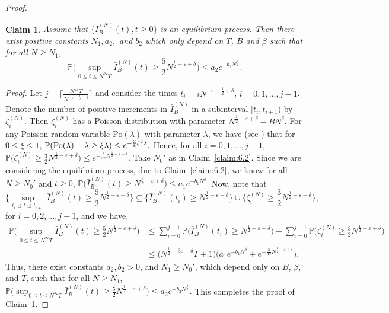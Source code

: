 \documentclass[11pt, reqno]{article}
\DeclarePairedDelimiter\autobracket{(}{)}
\newcommand{\br}[1]{\autobracket*{#1}}
\newtheorem{claim}[theorem]{Claim}
\numberwithin{equation}{section}
\numberwithin{theorem}{section}
\begin{document}
\begin{proof}
\begin{claim}\label{claim:stat-proc}
Assume that $\{\bar{I}^{(N)}_B(t),t\geq 0\}$ is an equilibrium process. Then there exist positive constants $N_1, a_2,$ and $b_2$ which only depend on $T$, $B$ and $\beta$ such that 
for all $N\geq N_1$,
$$\mathbb{P}\big(\sup_{0\leq t\leq N^{2\varepsilon}T}\bar{I}^{(N)}_B(t)\geq \frac{5}{2} N^{\frac{1}{2}-\varepsilon+\delta}\big)\leq a_2 e^{-b_2N^{\frac{\delta}{2}}}.$$
\end{claim}
\emph{Proof.}
Let $j=\lceil\frac{N^{2\varepsilon}T}{N^{-\varepsilon-\frac{1}{2}+\delta}}\rceil$ and consider the times $t_i=iN^{-\varepsilon-\frac{1}{2}+\delta}$, $i=0,1,...,j-1$. 
Denote the number of positive increments in $\bar{I}^{(N)}_B$ in a subinterval $[t_{i},t_{i+1})$ by $\zeta^{(N)}_i$.
Then $\zeta^{(N)}_i$
has a Poisson distribution with parameter $N^{\frac{1}{2}-\varepsilon+\delta}-B N^{\delta}$. 
For any Poisson random variable $\mathrm{Po}(\lambda)$ with parameter $\lambda$, we have (see \cite[Theorem 2.3(b)]{MC98}) that for $0\leq \xi\leq 1$,
$\mathbb{P}\br{\mathrm{Po}(\lambda)-\lambda\geq \xi \lambda}\leq e^{-\frac{3}{8}\xi^2\lambda}.$
Hence, for all $i=0,1,...,j-1$,
$\mathbb{P}\big(\zeta^{(N)}_i\geq \frac{3}{2}N^{\frac{1}{2}-\varepsilon+\delta}\big)\leq e^{-\frac{3}{32}N^{\frac{1}{2}-\varepsilon+\delta}}.$
Take $N_0'$ as in Claim~\ref{claim:6.2}.
Since we are considering the equilibrium process, due to Claim~\ref{claim:6.2}, we know for all $N\geq N_0'$ and $t\geq 0$, $\mathbb{P}\big(\bar{I}^{(N)}_B(t)\geq N^{\frac{1}{2}-\varepsilon+\delta}\big)\leq a_1 e^{-b_1N^{\delta}}.$
Now, note that
$$\Big\{\sup_{t_i\leq t\leq t_{i+1}}\bar{I}^{(N)}_B(t)\geq \frac{5}{2}N^{\frac{1}{2}-\varepsilon+\delta} \Big\}\subseteq \Big\{\bar{I}^{(N)}_B(t_i)\geq N^{\frac{1}{2}-\varepsilon+\delta}\Big\}\cup\Big\{\zeta^{(N)}_i\geq \frac{3}{2}N^{\frac{1}{2}-\varepsilon+\delta}\Big\},$$ 
for $i=0,2,...,j-1$, and
we have,
\begin{align*}
    \mathbb{P}\big(\sup_{0\leq t\leq N^{2\varepsilon}T}\bar{I}^{(N)}_B(t)\geq \frac{5}{2}N^{\frac{1}{2}-\varepsilon+\delta}\big)
    &\leq  \sum_{i=0}^{j-1}\mathbb{P}\big(\bar{I}^{(N)}_B(t_i)\geq N^{\frac{1}{2}-\varepsilon+\delta}\big)+\sum_{i=0}^{j-1}\mathbb{P}\big(\zeta^{(N)}_i\geq \frac{3}{2}N^{\frac{1}{2}-\varepsilon+\delta}\big)\\
    &\leq  \big(N^{\frac{1}{2}+3\varepsilon-\delta}T +1\big)\big(a_1 e^{-b_1N^{\delta}}+e^{-\frac{3}{32}N^{\frac{1}{2}-\varepsilon+\delta}}\big).
\end{align*}
Thus, there exist constants $a_2, b_2>0$, and $N_1\geq N_0'$, which depend only on $B$, $\beta$, and $T$, such that for all $N\geq N_1$,
$\mathbb{P}\big(\sup_{0\leq t\leq N^{2\varepsilon}T}\bar{I}^{(N)}_B(t)\geq \frac{5}{2}N^{\frac{1}{2}-\varepsilon+\delta}\big) \leq a_2 e^{-b_2N^{\frac{\delta}{2}}}.$ 
This completes the proof of Claim~\ref{claim:stat-proc}.


\end{proof}
\end{document}
